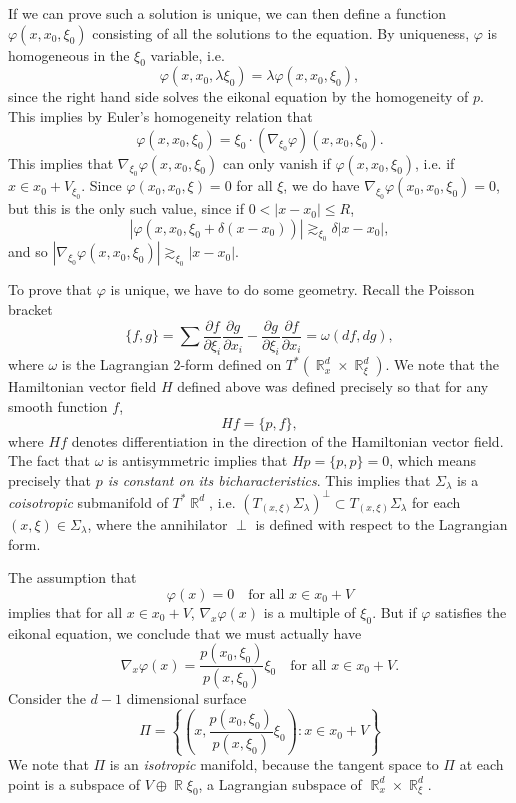 \documentclass{article}
\theoremstyle{plain}
\theoremstyle{remark}
\theoremstyle{definition}
\DeclareMathOperator{\RR}{\mathbb{R}}
\begin{document}
If we can prove such a solution is unique, we can then define a function $\varphi(x,x_0,\xi_0)$ consisting of all the solutions to the equation. By uniqueness, $\varphi$ is homogeneous in the $\xi_0$ variable, i.e.
%
\[ \varphi(x,x_0,\lambda \xi_0) = \lambda \varphi(x,x_0,\xi_0), \]
%
since the right hand side solves the eikonal equation by the homogeneity of $p$. This implies by Euler's homogeneity relation that
%
\[ \varphi(x,x_0,\xi_0) = \xi_0 \cdot (\nabla_{\xi_0} \varphi)(x,x_0,\xi_0). \]
%
This implies that $\nabla_{\xi_0} \varphi(x,x_0,\xi_0)$ can only vanish if $\varphi(x,x_0,\xi_0)$, i.e. if $x \in x_0 + V_{\xi_0}$. Since $\varphi(x_0, x_0, \xi) = 0$ for all $\xi$, we do have $\nabla_{\xi_0} \varphi(x_0,x_0,\xi_0) = 0$, but this is the only such value, since if $0 < |x - x_0| \leq R$,
%
\[ |\varphi(x,x_0,\xi_0 + \delta ( x - x_0 ) )| \gtrsim_{\xi_0} \delta |x - x_0|, \]
%
and so $|\nabla_{\xi_0} \varphi(x,x_0,\xi_0)| \gtrsim_{\xi_0} |x - x_0|$.

To prove that $\varphi$ is unique, we have to do some geometry. Recall the Poisson bracket
%
\[ \{ f, g \} = \sum \frac{\partial f}{\partial \xi_i} \frac{\partial g}{\partial x_i} - \frac{\partial g}{\partial \xi_i} \frac{\partial f}{\partial x_i} = \omega \left( df, dg \right), \]
%
where $\omega$ is the Lagrangian 2-form defined on $T^*(\RR^d_x \times \RR^d_\xi)$. We note that the Hamiltonian vector field $H$ defined above was defined precisely so that for any smooth function $f$,
%
\[ Hf = \{ p, f \}, \]
%
where $Hf$ denotes differentiation in the direction of the Hamiltonian vector field. The fact that $\omega$ is antisymmetric implies that $Hp = \{ p, p \} = 0$, which means precisely that \emph{$p$ is constant on its bicharacteristics}. This implies that $\Sigma_\lambda$ is a \emph{coisotropic} submanifold of $T^* \RR^d$, i.e. $(T_{(x,\xi)} \Sigma_\lambda)^\perp \subset T_{(x,\xi)} \Sigma_\lambda$ for each $(x,\xi) \in \Sigma_\lambda$, where the annihilator $\perp$ is defined with respect to the Lagrangian form.

The assumption that
%
\[ \varphi(x) = 0 \quad\text{for all $x \in x_0 + V$} \]
%
implies that for all $x \in x_0 + V$, $\nabla_x \varphi(x)$ is a multiple of $\xi_0$. But if $\varphi$ satisfies the eikonal equation, we conclude that we must actually have
%
\[ \nabla_x \varphi(x) = \frac{p(x_0,\xi_0)}{p(x,\xi_0)} \xi_0 \quad\text{for all $x \in x_0 + V$}. \]
%
Consider the $d-1$ dimensional surface
%
\[ \Pi = \left\{ \left( x, \frac{p(x_0,\xi_0)}{p(x,\xi_0)} \xi_0 \right) : x \in x_0 + V \right\} \]
%
We note that $\Pi$ is an \emph{isotropic} manifold, because the tangent space to $\Pi$ at each point is a subspace of $V \oplus \RR \xi_0$, a Lagrangian subspace of $\RR^d_x \times \RR^d_\xi$.
\end{document}
